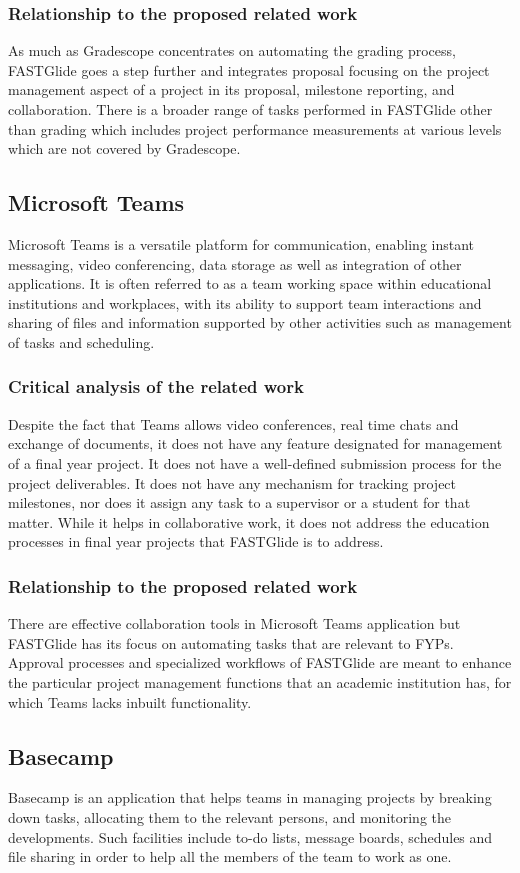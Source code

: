 \documentclass{FastFyp}
\begin{document}
\subsubsection{Relationship to the proposed related work}
As much as Gradescope concentrates on automating the grading process, FASTGlide goes a step further and integrates proposal focusing on the project management aspect of a project in its proposal, milestone reporting, and collaboration. There is a broader range of tasks performed in FASTGlide other than grading which includes project performance measurements at various levels which are not covered by Gradescope.
\subsection{Microsoft Teams}
Microsoft Teams \cite{ref:teams} is a versatile platform for communication, enabling instant messaging, video conferencing, data storage as well as integration of other applications. It is often referred to as a team working space within educational institutions and workplaces, with its ability to support team interactions and sharing of files and information supported by other activities such as management of tasks and scheduling.
\subsubsection{Critical analysis of the related work}
Despite the fact that Teams allows video conferences, real time chats and exchange of documents, it does not have any feature designated for management of a final year project. It does not have a well-defined submission process for the project deliverables. It does not have any mechanism for tracking project milestones, nor does it assign any task to a supervisor or a student for that matter. While it helps in collaborative work, it does not address the education processes in final year projects that FASTGlide is to address.
\subsubsection{Relationship to the proposed related work}
There are effective collaboration tools in Microsoft Teams application but FASTGlide has its focus on automating tasks that are relevant to FYPs. Approval processes and specialized workflows of FASTGlide are meant to enhance the particular project management functions that an academic institution has, for which Teams lacks inbuilt functionality.
\subsection{Basecamp}
Basecamp \cite{ref:basecamp} is an application that helps teams in managing projects by breaking down tasks, allocating them to the relevant persons, and monitoring the developments. Such facilities include to-do lists, message boards, schedules and file sharing in order to help all the members of the team to work as one.
\end{document}
